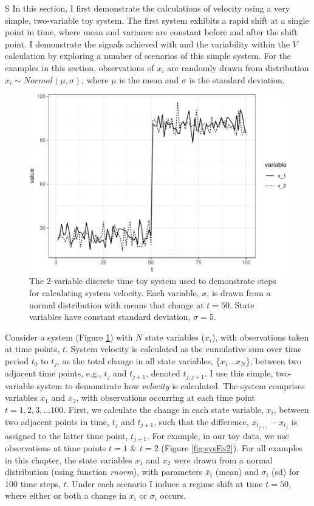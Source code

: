 \documentclass[12pt,twoside,openany]{reedthesis}
\begin{document}
S
In this section, I first demonstrate the calculations of velocity using a very simple, two-variable toy system. The first system exhibits a rapid shift at a single point in time, where mean and variance are constant before and after the shift point. I demonstrate the signals achieved with and the variability within the \(V\) calculation by exploring a number of scenarios of this simple system. For the examples in this section, observations of \(x_i\) are randomly drawn from distribution \(x_i\sim Normal(\mu, \sigma)\), where \(\mu\) is the mean and \(\sigma\) is the standard deviation.
\begin{figure}[bth]

{\centering \includegraphics[width=0.85\linewidth]{_myDissertation_files/figure-latex/sysEx-1} 

}

\caption{The 2-variable discrete time toy system used to demonstrate steps for calculating system velocity. Each variable, $x$, is drawn from a normal distribution with means that change at $t = 50$. State variables have constant standard deviation, $\sigma = 5$.}\label{fig:sysEx}
\end{figure}
Consider a system (Figure \ref{fig:sysEx}) with \(N\) state variables (\(x_i\)), with observations taken at time points, \(t\). System velocity is calculated as the cumulative sum over time period \(t_0\) to \(t_j\), as the total change in all state variables, \{\(x_1 ...x_N\)\}, between two adjacent time points, e.g., \(t_j\) and \(t_{j+1}\), denoted \(t_{j,j+1}\). I use this simple, two-variable system to demonstrate how \emph{velocity} is calculated. The system comprises variables \(x_1\) and \(x_2\), with observations occurring at each time point \(t = {1,2,3,...100}\). First, we calculate the change in each state variable, \(x_i\), between two adjacent points in time, \(t_j\) and \(t_{j+1}\), such that the difference, \(x_{t_{j+1}} - x_{t_j}\) is assigned to the latter time point, \(t_{j+1}\). For example, in our toy data, we use observations at time points \(t = 1\) \& \(t=2\) (Figure \ref{fig:sysEx2}). For all examples in this chapter, the state variables \(x_1\) and \(x_2\) were drawn from a normal distribution (using function \emph{rnorm}), with parameters \(\bar{x}_i\) (mean) and \(\sigma_i\) (sd) for 100 time steps, \(t\). Under each scenario I induce a regime shift at time \(t=50\), where either or both a change in \(\bar{x}_i\) or \(\sigma_i\) occurs.
\end{document}
